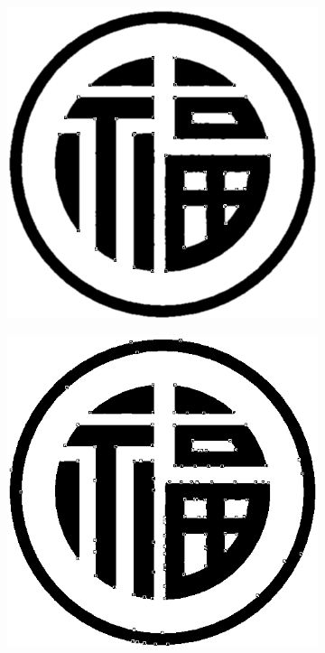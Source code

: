 \documentclass[letterpaper, 10 pt, conference]{ieeeconf}  %
\begin{document}
\begin{figure}[htbp]
\begin{subfigure}[b]{0.49\linewidth}
      \includegraphics[width=\linewidth]{experiments/fu_ECSS.png}
      \caption{}
    \end{subfigure}
       	\begin{subfigure}[b]{0.49\linewidth}
    	\includegraphics[width=\linewidth]{experiments/fu_RCSS.png}

\end{subfigure}
\end{figure}
\end{document}
